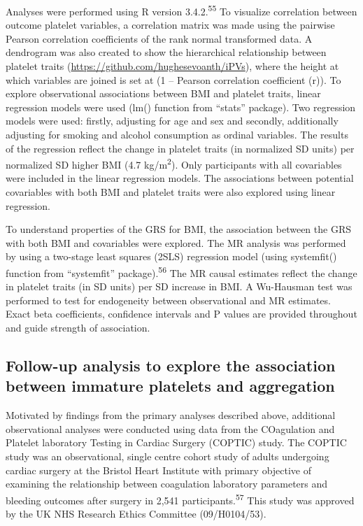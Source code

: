 \documentclass[11pt,twoside]{bristolthesis}
\begin{document}
Analyses were performed using R version 3.4.2.\textsuperscript{55} To visualize correlation between outcome platelet variables, a correlation matrix was made using the pairwise Pearson correlation coefficients of the rank normal transformed data. A dendrogram was also created to show the hierarchical relationship between platelet traits (\url{https://github.com/hughesevoanth/iPVs}), where the height at which variables are joined is set at (1 -- Pearson correlation coefficient (r)). To explore observational associations between BMI and platelet traits, linear regression models were used (lm() function from ``stats'' package). Two regression models were used: firstly, adjusting for age and sex and secondly, additionally adjusting for smoking and alcohol consumption as ordinal variables. The results of the regression reflect the change in platelet traits (in normalized SD units) per normalized SD higher BMI (4.7 kg/m\textsuperscript{2}). Only participants with all covariables were included in the linear regression models. The associations between potential covariables with both BMI and platelet traits were also explored using linear regression.

To understand properties of the GRS for BMI, the association between the GRS with both BMI and covariables were explored. The MR analysis was performed by using a two-stage least squares (2SLS) regression model (using systemfit() function from ``systemfit'' package).\textsuperscript{56} The MR causal estimates reflect the change in platelet traits (in SD units) per SD increase in BMI. A Wu-Hausman test was performed to test for endogeneity between observational and MR estimates. Exact beta coefficients, confidence intervals and P values are provided throughout and guide strength of association.

\hypertarget{follow-up-analysis-to-explore-the-association-between-immature-platelets-and-aggregation}{%
\subsection{Follow-up analysis to explore the association between immature platelets and aggregation}\label{follow-up-analysis-to-explore-the-association-between-immature-platelets-and-aggregation}}

Motivated by findings from the primary analyses described above, additional observational analyses were conducted using data from the COagulation and Platelet laboratory Testing in Cardiac Surgery (COPTIC) study. The COPTIC study was an observational, single centre cohort study of adults undergoing cardiac surgery at the Bristol Heart Institute with primary objective of examining the relationship between coagulation laboratory parameters and bleeding outcomes after surgery in 2,541 participants.\textsuperscript{57} This study was approved by the UK NHS Research Ethics Committee (09/H0104/53).
\end{document}
